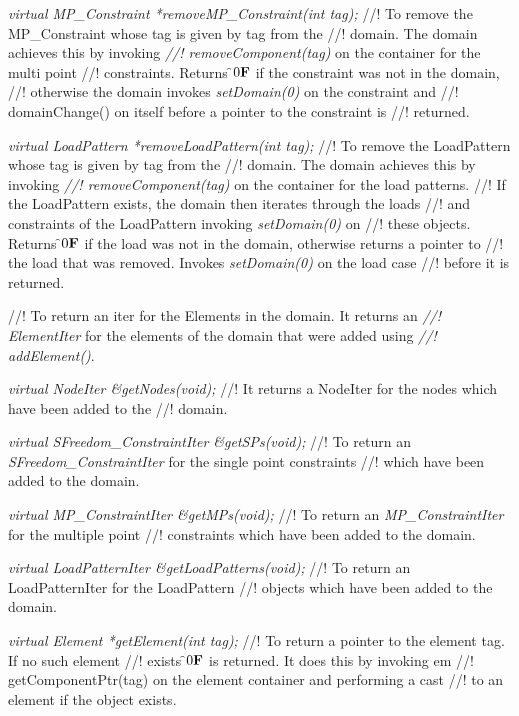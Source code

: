 {\em virtual MP\_Constraint *removeMP\_Constraint(int tag);} 
//! To remove the MP\_Constraint whose tag is given by \p tag from the
//! domain. The domain achieves this by invoking {\em
//! removeComponent(tag)} on the container for the multi point
//! constraints. Returns \f$0{\bf F}$ if the constraint was not in the domain,
//! otherwise the domain invokes {\em setDomain(0)} on the constraint and
//! domainChange() on itself before a pointer to the constraint is
//! returned.   

{\em virtual LoadPattern *removeLoadPattern(int tag);}         
//! To remove the LoadPattern whose tag is given by \p tag from the
//! domain. The domain achieves this by invoking {\em
//! removeComponent(tag)} on the container for the load patterns. 
//! If the LoadPattern exists, the domain then iterates through the loads
//! and constraints of the LoadPattern invoking {\em setDomain(0)} on
//! these objects. Returns
\f$0{\bf F}$ if the load was not in the domain, otherwise returns a pointer to
//! the load that was removed. Invokes {\em setDomain(0)} on the load case
//! before it is returned. 


//! To return an iter for the Elements in the domain. It returns an {\em
//! ElementIter} for the elements of the domain that were added using {\em
//! addElement()}.   

{\em virtual NodeIter \&getNodes(void);} 
//! It returns a \p NodeIter for the nodes which have been added to the
//! domain.  

{\em virtual SFreedom\_ConstraintIter \&getSPs(void);} 
//! To return an {\em SFreedom\_ConstraintIter} for the single point constraints
//! which have been added to the domain.  

{\em virtual MP\_ConstraintIter \&getMPs(void);} 
//! To return an {\em MP\_ConstraintIter} for the multiple point
//! constraints which have been added to the domain.  

{\em virtual LoadPatternIter \&getLoadPatterns(void);} 
//! To return an \p LoadPatternIter for the LoadPattern
//! objects which have been added to the domain.  

{\em virtual  Element *getElement(int tag);}
//! To return a pointer to the element \p tag. If no such element
//! exists \f$0{\bf F}$ is returned. It does this by invoking {em
//! getComponentPtr(tag)} on the element container and performing a cast
//! to an element if the object exists. 

